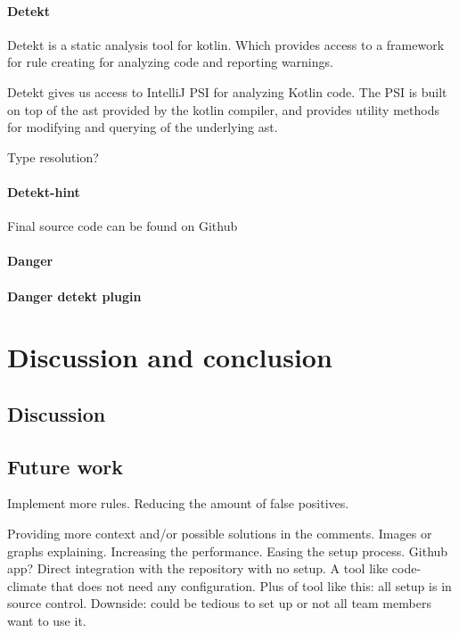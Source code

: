 \documentclass{report}
\begin{document}
\subsubsection{Detekt}
Detekt is a static analysis tool for kotlin. Which provides access to a framework for rule creating for analyzing code and reporting warnings.

Detekt gives us access to IntelliJ PSI for analyzing Kotlin code. The PSI is built on top of the \gls{ast} provided by the kotlin compiler, and provides utility methods for modifying and querying of the underlying \gls{ast}.

Type resolution?

\subsubsection{Detekt-hint}
Final source code can be found on Github\cite{detekt-hint-repository}

\subsubsection{Danger}

\subsubsection{Danger detekt plugin}

\chapter{Discussion and conclusion}
\label{discussion}

\section{Discussion}

\section{Future work}
Implement more rules.
Reducing the amount of false positives.

Providing more context and/or possible solutions in the comments. Images or graphs explaining.
Increasing the performance.
Easing the setup process. Github app? Direct integration with the repository with no setup. A tool like code-climate that does not need any configuration. Plus of tool like this: all setup is in source control. Downside: could be tedious to set up or not all team members want to use it.
\end{document}
